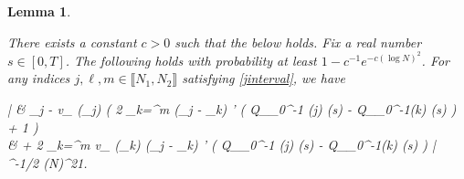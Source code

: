 \documentclass{amsart}
\numberwithin{equation}{section}
\DeclareMathOperator{\eff}{eff}
\newtheorem{lem}[thm]{Lemma}
\theoremstyle{remark}
\theoremstyle{definition}
\begin{document}
	
	\begin{lem} 
		
		\label{lambdajq2} 
		
		There exists a constant $c>0$ such that the below holds. Fix a real number $s \in [0, T]$. The following holds with probability at least $1 - c^{-1} e^{-c(\log N)^2}$. For any indices $j, \ell, m \in \llbracket N_1, N_2 \rrbracket$ satisfying \eqref{jinterval}, we have 
		\begin{flalign}
			\label{vlambda02} 
			\begin{aligned} 
				\Bigg| & \Lambda_j -  v_{\eff} (\Lambda_j) \cdot \bigg( 2 \displaystyle\sum_{k=\ell}^{m}  (\Lambda_j - \Lambda_k) \cdot \chi' \big( Q_{\varphi_0^{-1} (j)} (s) - Q_{\varphi_0^{-1}(k)} (s) \big) + 1 \bigg) \\
				& \qquad \quad   + 2 \displaystyle\sum_{k=\ell}^m v_{\eff} (\Lambda_k) \cdot {} (\Lambda_j - \Lambda_k) \cdot \chi' \big( Q_{\varphi_0^{-1} (j)} (s) - Q_{\varphi_0^{-1}(k)} (s) \big) \Bigg| \le \displaystyle{} \cdot {}^{-1/2} (\log N)^{21}.
			\end{aligned} 
		\end{flalign} 
		
	\end{lem} 
\end{document}

